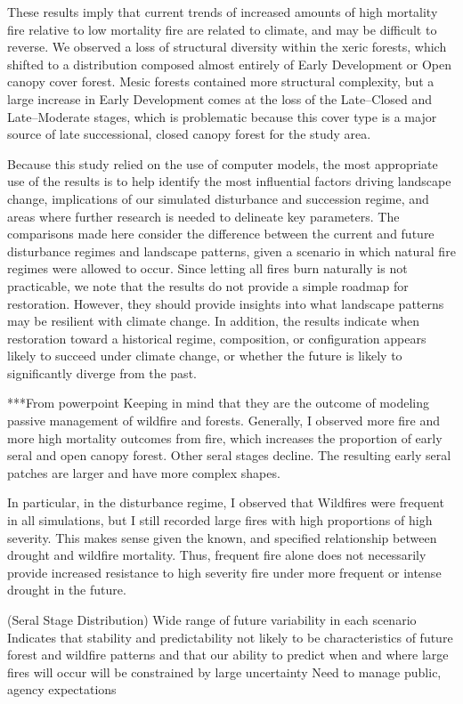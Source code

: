 These results imply that current trends of increased amounts of high mortality fire relative to low mortality fire are related to climate, and may be difficult to reverse. We observed a loss of structural diversity within the xeric forests, which shifted to a distribution composed almost entirely of Early Development or Open canopy cover forest. Mesic forests contained more structural complexity, but a large increase in Early Development comes at the loss of the Late--Closed and Late--Moderate stages, which is problematic because this cover type is a major source of late successional, closed canopy forest for the study area.

Because this study relied on the use of computer models, the most appropriate use of the results is to help identify the most influential factors driving landscape change, implications of our simulated disturbance and succession regime, and areas where further research is needed to delineate key parameters. The comparisons made here consider the difference between the current and future disturbance regimes and landscape patterns, given a scenario in which natural fire regimes were allowed to occur. Since letting all fires burn naturally is not practicable, we note that the results do not provide a simple roadmap for restoration. However, they should provide insights into what landscape patterns may be resilient with climate change. In addition, the results indicate when restoration toward a historical regime, composition, or configuration appears likely to succeed under climate change, or whether the future is likely to significantly diverge from the past.

***From powerpoint
Keeping in mind that they are the outcome of modeling passive management of wildfire and forests. 
Generally, I observed more fire and more high mortality outcomes from fire, which increases the proportion of early seral and open canopy forest. 
Other seral stages decline. 
The resulting early seral patches are larger and have more complex shapes.

In particular, in the disturbance regime, I observed that
Wildfires were frequent in all simulations, but I still recorded large fires with high proportions of high severity. 
This makes sense given the known, and specified relationship between drought and wildfire mortality.
Thus, frequent fire alone does not necessarily provide increased resistance to high severity fire under more frequent or intense drought in the future. 

(Seral Stage Distribution) 
Wide range of future variability in each scenario
Indicates that stability and predictability not likely to be characteristics of future forest and wildfire patterns and that our ability to predict when and where large fires will occur will be constrained by large uncertainty
Need to manage public, agency expectations

